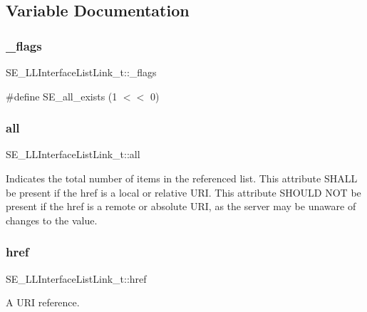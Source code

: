 \subsection{Variable Documentation}
\mbox{\label{group__LLInterfaceListLink_ga6fe2edb567956b79e403f7d527f393c9}} 
\subsubsection{\texorpdfstring{\+\_\+flags}{\_flags}}
{\footnotesize\ttfamily S\+E\+\_\+\+L\+L\+Interface\+List\+Link\+\_\+t\+::\+\_\+flags}

\#define S\+E\+\_\+all\+\_\+exists (1 $<$$<$ 0) \mbox{\label{group__LLInterfaceListLink_ga56592daceaa11b288eabb30bc1c2a6f8}} 
\subsubsection{\texorpdfstring{all}{all}}
{\footnotesize\ttfamily S\+E\+\_\+\+L\+L\+Interface\+List\+Link\+\_\+t\+::all}

Indicates the total number of items in the referenced list. This attribute S\+H\+A\+LL be present if the href is a local or relative U\+RI. This attribute S\+H\+O\+U\+LD N\+OT be present if the href is a remote or absolute U\+RI, as the server may be unaware of changes to the value. \mbox{\label{group__LLInterfaceListLink_gae5704d601086f05c2eec2e9fa79575e1}} 
\subsubsection{\texorpdfstring{href}{href}}
{\footnotesize\ttfamily S\+E\+\_\+\+L\+L\+Interface\+List\+Link\+\_\+t\+::href}

A U\+RI reference. 